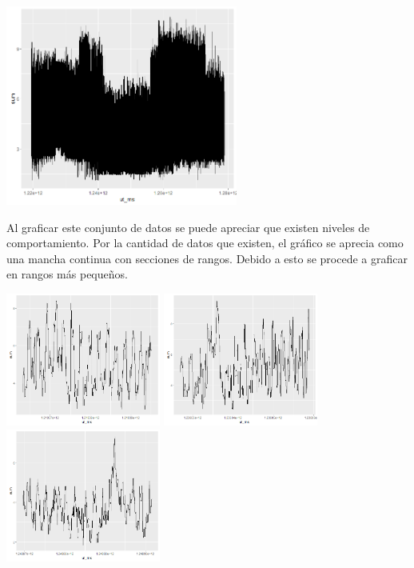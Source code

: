\documentclass[../Main.tex]{subfiles}
\begin{document}
\begin{center}
\includegraphics[width=3in]{Assets/power1SumAll.png}
\end{center}

Al graficar este conjunto de datos se puede apreciar que existen niveles de comportamiento. Por la cantidad de datos que existen, el gráfico se aprecia como una mancha continua con secciones de rangos. Debido a esto se procede a graficar en rangos más pequeños.

\begin{center}
\includegraphics[width=2in]{Assets/power1Sum1k.png}
\includegraphics[width=2in]{Assets/power1Sum5hk1k.png}
\includegraphics[width=2in]{Assets/power1Sum9hk1k.png}
\end{center}
\end{document}
